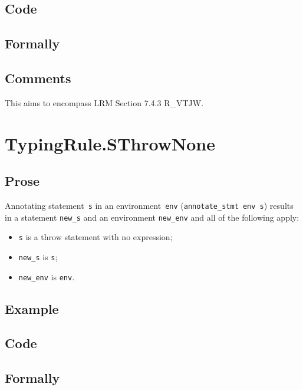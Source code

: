 \documentclass{book}
\begin{document}
  \subsection{Code}

\begin{emptyformal}
    \subsection{Formally}
\end{emptyformal}

\subsection{Comments}
    This aims to encompass LRM Section 7.4.3 R\_VTJW.


\section{TypingRule.SThrowNone \label{sec:TypingRule.SThrowNone}}

  \subsection{Prose}
Annotating statement~\texttt{s} in an environment~\texttt{env}
(\texttt{annotate\_stmt env s}) results in a statement \texttt{new\_s} and an
environment \texttt{new\_env} and all of the following apply:
   \begin{itemize}
   \item \texttt{s} is a throw statement with no expression;
   \item \texttt{new\_s} is \texttt{s};
   \item \texttt{new\_env} is \texttt{env}.
   \end{itemize}

  \subsection{Example}

  \subsection{Code}

\begin{emptyformal}
    \subsection{Formally}
\end{emptyformal}
\end{document}
